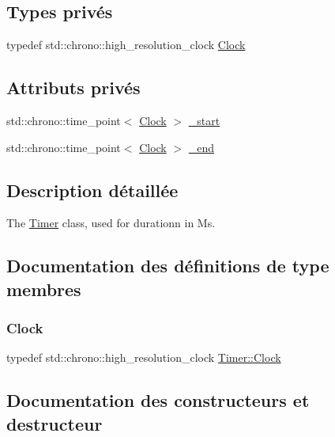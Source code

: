 \subsection*{Types privés}
\begin{DoxyCompactItemize}
\item 
typedef std\+::chrono\+::high\+\_\+resolution\+\_\+clock \hyperlink{class_timer_ab6fc5ea7e1e1e2e3cfa79f8c7cc7005e}{Clock}
\end{DoxyCompactItemize}
\subsection*{Attributs privés}
\begin{DoxyCompactItemize}
\item 
std\+::chrono\+::time\+\_\+point$<$ \hyperlink{class_timer_ab6fc5ea7e1e1e2e3cfa79f8c7cc7005e}{Clock} $>$ \hyperlink{class_timer_a9b41a3f523644760dd5745e409b3257a}{\+\_\+start}
\item 
std\+::chrono\+::time\+\_\+point$<$ \hyperlink{class_timer_ab6fc5ea7e1e1e2e3cfa79f8c7cc7005e}{Clock} $>$ \hyperlink{class_timer_ab99bbd400ec9df87fb528f817859a3fd}{\+\_\+end}
\end{DoxyCompactItemize}


\subsection{Description détaillée}
The \hyperlink{class_timer}{Timer} class, used for durationn in Ms. 

\subsection{Documentation des définitions de type membres}
\mbox{\label{class_timer_ab6fc5ea7e1e1e2e3cfa79f8c7cc7005e}} 
\subsubsection{\texorpdfstring{Clock}{Clock}}
{\footnotesize\ttfamily typedef std\+::chrono\+::high\+\_\+resolution\+\_\+clock \hyperlink{class_timer_ab6fc5ea7e1e1e2e3cfa79f8c7cc7005e}{Timer\+::\+Clock}\hspace{0.3cm}{\ttfamily [private]}}



\subsection{Documentation des constructeurs et destructeur}
\mbox{\label{class_timer_a8ed3c5e074223900c0c9a74376471209}} 

